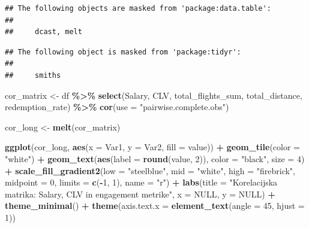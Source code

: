 \documentclass[
]{article}
\newenvironment{Shaded}{\begin{snugshade}}{\end{snugshade}}
\newcommand{\AttributeTok}[1]{\textcolor[rgb]{0.13,0.29,0.53}{#1}}
\newcommand{\ConstantTok}[1]{\textcolor[rgb]{0.56,0.35,0.01}{#1}}
\newcommand{\DecValTok}[1]{\textcolor[rgb]{0.00,0.00,0.81}{#1}}
\newcommand{\FunctionTok}[1]{\textcolor[rgb]{0.13,0.29,0.53}{\textbf{#1}}}
\newcommand{\NormalTok}[1]{#1}
\newcommand{\OtherTok}[1]{\textcolor[rgb]{0.56,0.35,0.01}{#1}}
\newcommand{\SpecialCharTok}[1]{\textcolor[rgb]{0.81,0.36,0.00}{\textbf{#1}}}
\newcommand{\StringTok}[1]{\textcolor[rgb]{0.31,0.60,0.02}{#1}}
\begin{document}
\begin{verbatim}
## The following objects are masked from 'package:data.table':
## 
##     dcast, melt
\end{verbatim}

\begin{verbatim}
## The following object is masked from 'package:tidyr':
## 
##     smiths
\end{verbatim}

\begin{Shaded}
\begin{Highlighting}[]
\NormalTok{cor\_matrix }\OtherTok{\textless{}{-}}\NormalTok{ df }\SpecialCharTok{\%\textgreater{}\%}
  \FunctionTok{select}\NormalTok{(Salary, CLV, total\_flights\_sum, total\_distance, redemption\_rate) }\SpecialCharTok{\%\textgreater{}\%}
  \FunctionTok{cor}\NormalTok{(}\AttributeTok{use =} \StringTok{"pairwise.complete.obs"}\NormalTok{)}

\NormalTok{cor\_long }\OtherTok{\textless{}{-}} \FunctionTok{melt}\NormalTok{(cor\_matrix)}

\FunctionTok{ggplot}\NormalTok{(cor\_long, }\FunctionTok{aes}\NormalTok{(}\AttributeTok{x =}\NormalTok{ Var1, }\AttributeTok{y =}\NormalTok{ Var2, }\AttributeTok{fill =}\NormalTok{ value)) }\SpecialCharTok{+}
  \FunctionTok{geom\_tile}\NormalTok{(}\AttributeTok{color =} \StringTok{"white"}\NormalTok{) }\SpecialCharTok{+}
  \FunctionTok{geom\_text}\NormalTok{(}\FunctionTok{aes}\NormalTok{(}\AttributeTok{label =} \FunctionTok{round}\NormalTok{(value, }\DecValTok{2}\NormalTok{)), }\AttributeTok{color =} \StringTok{"black"}\NormalTok{, }\AttributeTok{size =} \DecValTok{4}\NormalTok{) }\SpecialCharTok{+}
  \FunctionTok{scale\_fill\_gradient2}\NormalTok{(}\AttributeTok{low =} \StringTok{"steelblue"}\NormalTok{, }\AttributeTok{mid =} \StringTok{"white"}\NormalTok{, }\AttributeTok{high =} \StringTok{"firebrick"}\NormalTok{,}
                        \AttributeTok{midpoint =} \DecValTok{0}\NormalTok{, }\AttributeTok{limits =} \FunctionTok{c}\NormalTok{(}\SpecialCharTok{{-}}\DecValTok{1}\NormalTok{, }\DecValTok{1}\NormalTok{), }\AttributeTok{name =} \StringTok{"r"}\NormalTok{) }\SpecialCharTok{+}
  \FunctionTok{labs}\NormalTok{(}\AttributeTok{title =} \StringTok{"Korelacijska matrika: Salary, CLV in engagement metrike"}\NormalTok{,}
       \AttributeTok{x =} \ConstantTok{NULL}\NormalTok{, }\AttributeTok{y =} \ConstantTok{NULL}\NormalTok{) }\SpecialCharTok{+}
  \FunctionTok{theme\_minimal}\NormalTok{() }\SpecialCharTok{+}
  \FunctionTok{theme}\NormalTok{(}\AttributeTok{axis.text.x =} \FunctionTok{element\_text}\NormalTok{(}\AttributeTok{angle =} \DecValTok{45}\NormalTok{, }\AttributeTok{hjust =} \DecValTok{1}\NormalTok{))}
\end{Highlighting}
\end{Shaded}
\end{document}

